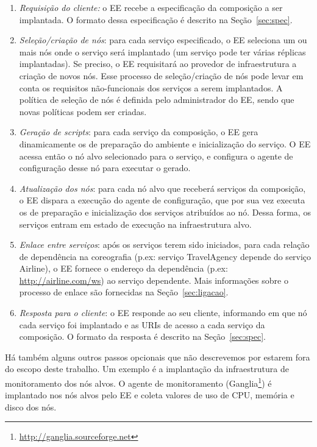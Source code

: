 \begin{enumerate}

\item \emph{Requisição do cliente:} o EE recebe a especificação da composição a ser implantada.
O formato dessa especificação é descrito na Seção~\ref{sec:spec}.

\item \emph{Seleção/criação de nós}: para cada serviço especificado, o EE seleciona um ou mais nós 
onde o serviço será implantado (um serviço pode ter várias réplicas implantadas). 
Se preciso, o EE requisitará ao provedor de infraestrutura a criação de novos nós.
Esse processo de seleção/criação de nós pode levar em conta os requisitos não-funcionais
dos serviços a serem implantados.
A política de seleção de nós é definida pelo administrador do EE, sendo que novas políticas podem ser criadas.

\item \emph{Geração de scripts}: para cada serviço da composição, 
o EE gera dinamicamente os \scripts de preparação do ambiente e inicialização do serviço. 
O EE acessa então o nó alvo selecionado para o serviço,
e configura o agente de configuração desse nó para executar o \script gerado.

\item \emph{Atualização dos nós}: para cada nó alvo que receberá serviços da composição,
o EE dispara a execução do agente de configuração, que por sua vez executa os \scripts 
de preparação e inicialização dos serviços atribuídos ao nó.
Dessa forma, os serviços entram em estado de execução na infraestrutura alvo.

\item \emph{Enlace entre serviços}: após os serviços terem sido iniciados, 
para cada relação de dependência na coreografia (p.ex: serviço \textsf{TravelAgency}
depende do serviço \textsf{Airline}), o EE fornece o endereço da dependência 
(p.ex: \url{http://airline.com/ws}) ao serviço dependente.
Mais informações sobre o processo de enlace são fornecidas na Seção~\ref{sec:ligacao}.

\item \emph{Resposta para o cliente}: o EE responde ao seu cliente,
informando em que nó cada serviço foi implantado
e as URIs de acesso a cada serviço da composição.
O formato da resposta é descrito na Seção~\ref{sec:spec}.

\end{enumerate}

Há também alguns outros passos opcionais que não descrevemos por estarem fora
do escopo deste trabalho. Um exemplo é a implantação da infraestrutura de monitoramento
dos nós alvos. O agente de monitoramento 
(Ganglia\footnote{\url{http://ganglia.sourceforge.net}})
é implantado nos nós alvos pelo EE e
coleta valores de uso de CPU, memória e disco dos nós.

